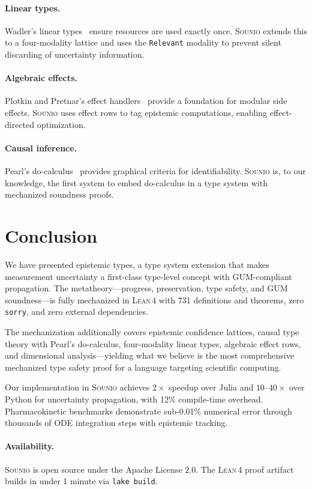 \documentclass[acmsmall,screen,review,anonymous]{acmart}
\newcommand{\sounio}{\textsc{Sounio}\xspace}
\newcommand{\lean}{\textsc{Lean\,4}\xspace}
\begin{document}
\paragraph{Linear types.}
Wadler's linear types~\cite{wadler1990linear} ensure resources are
used exactly once.
\sounio extends this to a four-modality lattice and uses the
\texttt{Relevant} modality to prevent silent discarding of
uncertainty information.

\paragraph{Algebraic effects.}
Plotkin and Pretnar's effect handlers~\cite{plotkin2009handlers}
provide a foundation for modular side effects.
\sounio uses effect rows to tag epistemic computations, enabling
effect-directed optimization.

\paragraph{Causal inference.}
Pearl's do-calculus~\cite{pearl2009causality} provides graphical
criteria for identifiability.
\sounio is, to our knowledge, the first system to embed
do-calculus in a type system with mechanized soundness proofs.

\section{Conclusion}
\label{sec:conclusion}

We have presented epistemic types, a type system extension that makes
measurement uncertainty a first-class type-level concept with
GUM-compliant propagation.
The metatheory---progress, preservation, type safety, and GUM
soundness---is fully mechanized in \lean with 731 definitions and
theorems, zero \texttt{sorry}, and zero external dependencies.

The mechanization additionally covers epistemic confidence lattices,
causal type theory with Pearl's do-calculus, four-modality linear types,
algebraic effect rows, and dimensional analysis---yielding what we
believe is the most comprehensive mechanized type safety proof for
a language targeting scientific computing.

Our implementation in \sounio achieves $2\times$ speedup over Julia
and $10$--$40\times$ over Python for uncertainty propagation, with
12\% compile-time overhead.
Pharmacokinetic benchmarks demonstrate sub-0.01\% numerical error
through thousands of ODE integration steps with epistemic tracking.

\paragraph{Availability.}
\sounio is open source under the Apache License 2.0.
The \lean proof artifact builds in under 1 minute via \texttt{lake build}.



\end{document}
